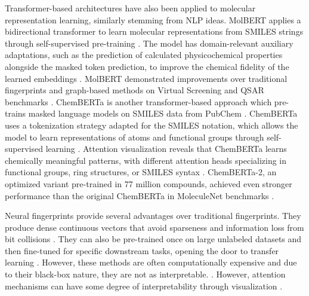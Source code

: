 Transformer-based architectures have also been applied to molecular representation learning, similarly stemming from NLP ideas. MolBERT applies a bidirectional transformer to learn molecular representations from SMILES strings through self-supervised pre-training \citep{Fabian2020}. The model has domain-relevant auxiliary adaptations, such as the prediction of calculated physicochemical properties alongside the masked token prediction, to improve the chemical fidelity of the learned embeddings \citep{Fabian2020}. MolBERT demonstrated improvements over traditional fingerprints and graph-based methods on Virtual Screening and QSAR benchmarks \citep{Fabian2020}. ChemBERTa is another transformer-based approach which pre-trains masked language models on SMILES data from PubChem \citep{Chithrananda2020}.  ChemBERTa uses a tokenization strategy adapted for the SMILES notation, which allows the model to learn representations of atoms and functional groups through self-supervised learning \citep{Chithrananda2020}. Attention visualization reveals that ChemBERTa learns chemically meaningful patterns, with different attention heads specializing in functional groups, ring structures, or SMILES syntax \citep{Chithrananda2020}. ChemBERTa-2, an optimized variant pre-trained in 77 million compounds, achieved even stronger performance than the original ChemBERTa in MoleculeNet benchmarks \citep{Ahmad2022}.

Neural fingerprints provide several advantages over traditional fingerprints. They produce dense continuous vectors that avoid sparseness and information loss from bit collisions \citep{Jaeger2018}. They can also be pre-trained once on large unlabeled datasets and then fine-tuned for specific downstream tasks, opening the door to transfer learning \citep{Chithrananda2020, Fabian2020}. However, these methods are often computationally expensive \citep{Jaeger2018} and due to their black-box nature, they are not as interpretable.  \citep{Chithrananda2020}. However, attention mechanisms can have some degree of interpretability through visualization \citep{Chithrananda2020}.

